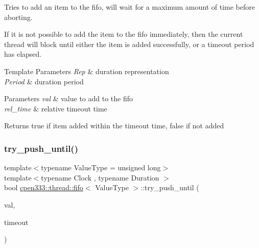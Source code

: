 Tries to add an item to the fifo, will wait for a maximum amount of time before aborting. 

If it is not possible to add the item to the fifo immediately, then the current thread will block until either the item is added successfully, or a timeout period has elapsed.


\begin{DoxyTemplParams}{Template Parameters}
{\em Rep} & duration representation \\
\hline
{\em Period} & duration period \\
\hline
\end{DoxyTemplParams}

\begin{DoxyParams}{Parameters}
{\em val} & value to add to the fifo \\
\hline
{\em rel\+\_\+time} & relative timeout time \\
\hline
\end{DoxyParams}
\begin{DoxyReturn}{Returns}
{\ttfamily true} if item added within the timeout time, {\ttfamily false} if not added 
\end{DoxyReturn}
\mbox{\label{classcpen333_1_1thread_1_1fifo_a988118f0498b8c1f76dcb417d7eb6fd2}} 
\subsubsection{\texorpdfstring{try\+\_\+push\+\_\+until()}{try\_push\_until()}}
{\footnotesize\ttfamily template$<$typename Value\+Type  = unsigned long$>$ \\
template$<$typename Clock , typename Duration $>$ \\
bool \hyperlink{classcpen333_1_1thread_1_1fifo}{cpen333\+::thread\+::fifo}$<$ Value\+Type $>$\+::try\+\_\+push\+\_\+until (\begin{DoxyParamCaption}\item[{const Value\+Type \&}]{val,  }\item[{const std\+::chrono\+::time\+\_\+point$<$ Clock, Duration $>$ \&}]{timeout }\end{DoxyParamCaption})\hspace{0.3cm}{\ttfamily [inline]}}



